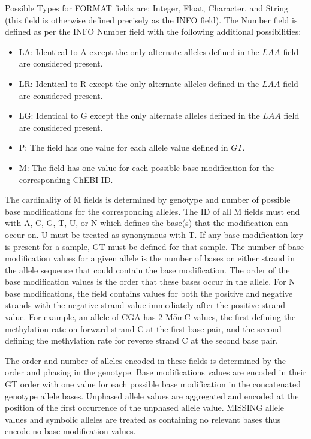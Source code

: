 \documentclass[8pt]{article}
\begin{document}
Possible Types for FORMAT fields are: Integer, Float, Character, and String (this field is otherwise defined precisely as the INFO field).
The Number field is defined as per the INFO Number field with the following additional possibilities:

\begin{itemize}
  \item LA: Identical to A except the only alternate alleles defined in the $LAA$ field are considered present.
  \item LR: Identical to R except the only alternate alleles defined in the $LAA$ field are considered present.
  \item LG: Identical to G except the only alternate alleles defined in the $LAA$ field are considered present.
  \item P: The field has one value for each allele value defined in $GT$.
  \item M: The field has one value for each possible base modification for the corresponding ChEBI ID.
\end{itemize}

The cardinality of M fields is determined by genotype and number of possible base modifications for the corresponding alleles.
The ID of all M fields must end with A, C, G, T, U, or N which defines the base(s) that the modification can occur on.
U must be treated as synonymous with T.
If any base modification key is present for a sample, GT must be defined for that sample.
The number of base modification values for a given allele is the number of bases on either strand in the allele sequence that could contain the base modification.
The order of the base modification values is the order that these bases occur in the allele.
For N base modifications, the field contains values for both the positive and negative strands with the negative strand value immediately after the positive strand value.
For example, an allele of CGA has 2 M5mC values, the first defining the methylation rate on forward strand C at the first base pair, and the second defining the methylation rate for reverse strand C at the second base pair.

The order and number of alleles encoded in these fields is determined by the order and phasing in the genotype.
Base modifications values are encoded in their GT order with one value for each possible base modification in the concatenated genotype allele bases.
Unphased allele values are aggregated and encoded at the position of the first occurrence of the unphased allele value.
MISSING allele values and symbolic alleles are treated as containing no relevant bases thus encode no base modification values.
\end{document}
